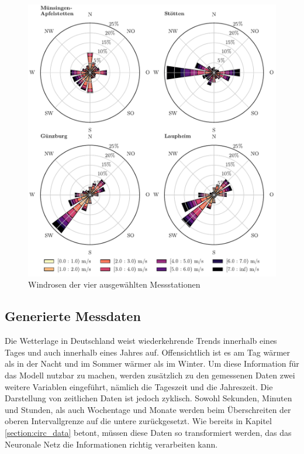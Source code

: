 \documentclass[
12pt, %
toc=listofnumbered, %
toc=chapterentrydotfill, %
numbers=noenddot, %
captions=tableheading, %
bibliography=numbered
]{scrreprt}
\let\Oldsubsection\subsection
\renewcommand{\subsection}{\FloatBarrier\Oldsubsection}
\begin{document}
\begin{figure}[tph]
	\begin{center}
		\includegraphics[width=0.9\linewidth]{./images/windroses.pdf}
		\caption{Windrosen der vier ausgewählten Messstationen}
		\label{fig:windroses}
	\end{center}
\end{figure}



\subsection{Generierte Messdaten}\label{section:gen_daten}
Die Wetterlage in Deutschland weist wiederkehrende Trends innerhalb eines Tages und auch innerhalb eines Jahres auf. Offensichtlich ist es am Tag wärmer als in der Nacht und im Sommer wärmer als im Winter. Um diese Information für das Modell nutzbar zu machen, werden zusätzlich zu den gemessenen Daten zwei weitere Variablen eingeführt, nämlich die Tageszeit und die Jahreszeit. 
Die Darstellung von zeitlichen Daten ist jedoch zyklisch. Sowohl Sekunden, Minuten und Stunden, als auch Wochentage und Monate werden beim Überschreiten der oberen Intervallgrenze auf die untere zurückgesetzt. Wie bereits in Kapitel \ref{section:circ_data} betont, müssen diese Daten so transformiert werden, das das Neuronale Netz die Informationen richtig verarbeiten kann.
\end{document}
